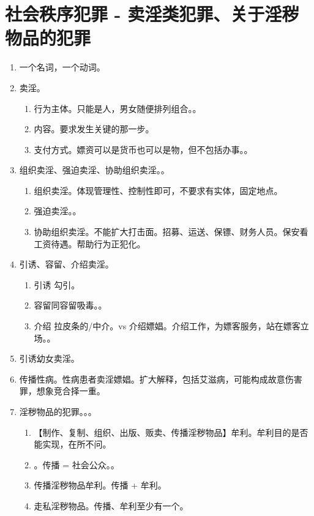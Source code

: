 \section{社会秩序犯罪 - 卖淫类犯罪、关于淫秽物品的犯罪}
\begin{enumerate}
  \item 一个名词，一个动词。
  \item 卖淫。
        \begin{enumerate}
          \item 行为主体。只能是人，男女随便排列组合。。
          \item 内容。要求发生关键的那一步。
          \item 支付方式。嫖资可以是货币也可以是物，但不包括办事。。
        \end{enumerate}
  \item 组织卖淫、强迫卖淫、协助组织卖淫。。
        \begin{enumerate}
          \item 组织卖淫。体现管理性、控制性即可，不要求有实体，固定地点。
          \item 强迫卖淫。。
          \item 协助组织卖淫。不能扩大打击面。招募、运送、保镖、财务人员。保安看工资待遇。帮助行为正犯化。
        \end{enumerate}
  \item 引诱、容留、介绍卖淫。
        \begin{enumerate}
          \item 引诱 \yjt 勾引。
          \item 容留同容留吸毒。。
          \item 介绍 \yjt 拉皮条的/中介。vs 介绍嫖娼。介绍工作，为嫖客服务，站在嫖客立场。。
        \end{enumerate}
  \item 引诱幼女卖淫。
  \item 传播性病。性病患者卖淫嫖娼。扩大解释，包括艾滋病，可能构成故意伤害罪，想象竞合择一重。
  \item 淫秽物品的犯罪。。。
        \begin{enumerate}
          \item 【制作、复制、组织、出版、贩卖、传播淫秽物品】牟利。牟利目的是否能实现，在所不问。
          \item {}。传播 = 社会公众。。
          \item 传播淫秽物品牟利。传播 + 牟利。
          \item 走私淫秽物品。传播、牟利至少有一个。
        \end{enumerate}
\end{enumerate}
